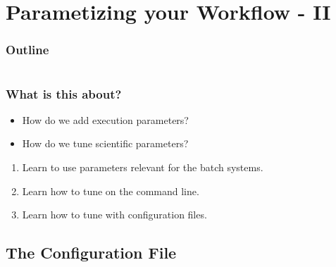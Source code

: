 \section{Parametizing your Workflow - II}

\begin{frame}
    \frametitle{Outline}
    \begin{columns}[t]
        \begin{column}{.5\textwidth}
            \tableofcontents[sections={1-9},currentsection]
        \end{column}
        \begin{column}{.5\textwidth}
            \tableofcontents[sections={10-18},currentsection]
        \end{column}
    \end{columns}
\end{frame}

\begin{frame}
  \frametitle{What is this about?}
  \begin{question}[Questions]
   	\begin{itemize}
      \item How do we add execution parameters?
      \item How do we tune scientific parameters?
    \end{itemize}
  \end{question}
   \begin{docs}[Objectives]
   	 \begin{enumerate} 
        \item Learn to use parameters relevant for the batch systems.
        \item Learn how to tune \Snakemake{} on the command line.
        \item Learn how to tune \Snakemake{} with configuration files.
    \end{enumerate}
  \end{docs}
\end{frame}

\subsection{The Configuration File}

